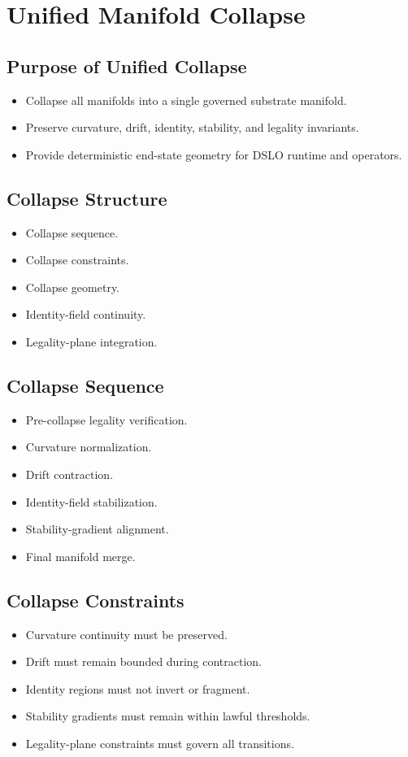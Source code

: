 \section{Unified Manifold Collapse}

\subsection{Purpose of Unified Collapse}
\begin{itemize}
    \item Collapse all manifolds into a single governed substrate manifold.
    \item Preserve curvature, drift, identity, stability, and legality invariants.
    \item Provide deterministic end-state geometry for DSLO runtime and operators.
\end{itemize}

\subsection{Collapse Structure}
\begin{itemize}
    \item Collapse sequence.
    \item Collapse constraints.
    \item Collapse geometry.
    \item Identity-field continuity.
    \item Legality-plane integration.
\end{itemize}

\subsection{Collapse Sequence}
\begin{itemize}
    \item Pre-collapse legality verification.
    \item Curvature normalization.
    \item Drift contraction.
    \item Identity-field stabilization.
    \item Stability-gradient alignment.
    \item Final manifold merge.
\end{itemize}

\subsection{Collapse Constraints}
\begin{itemize}
    \item Curvature continuity must be preserved.
    \item Drift must remain bounded during contraction.
    \item Identity regions must not invert or fragment.
    \item Stability gradients must remain within lawful thresholds.
    \item Legality-plane constraints must govern all transitions.
\end{itemize}

